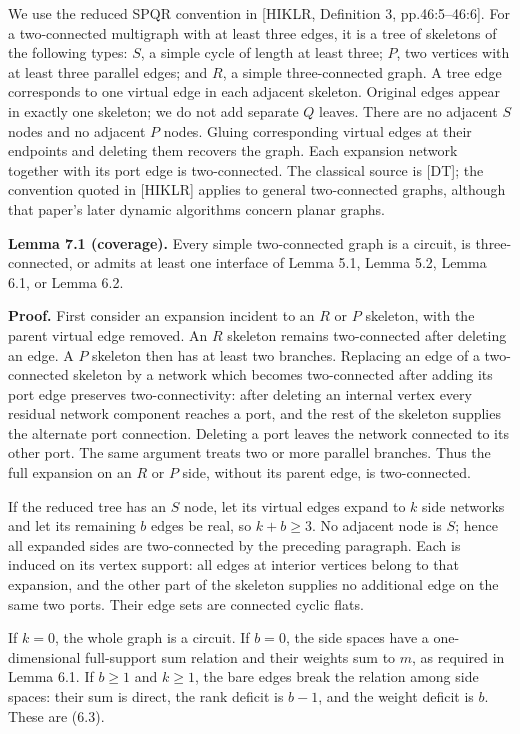 \documentclass[11pt]{article}
\begin{document}
We use the reduced SPQR convention in [HIKLR, Definition 3, pp.46:5--46:6]. For a two-connected multigraph with at least three edges, it is a tree of skeletons of the following types: $S$, a simple cycle of length at least three; $P$, two vertices with at least three parallel edges; and $R$, a simple three-connected graph. A tree edge corresponds to one virtual edge in each adjacent skeleton. Original edges appear in exactly one skeleton; we do not add separate $Q$ leaves. There are no adjacent $S$ nodes and no adjacent $P$ nodes. Gluing corresponding virtual edges at their endpoints and deleting them recovers the graph. Each expansion network together with its port edge is two-connected. The classical source is [DT]; the convention quoted in [HIKLR] applies to general two-connected graphs, although that paper's later dynamic algorithms concern planar graphs.

\textbf{Lemma 7.1 (coverage).} Every simple two-connected graph is a circuit, is three-connected, or admits at least one interface of Lemma 5.1, Lemma 5.2, Lemma 6.1, or Lemma 6.2.

\textbf{Proof.} First consider an expansion incident to an $R$ or $P$ skeleton, with the parent virtual edge removed. An $R$ skeleton remains two-connected after deleting an edge. A $P$ skeleton then has at least two branches. Replacing an edge of a two-connected skeleton by a network which becomes two-connected after adding its port edge preserves two-connectivity: after deleting an internal vertex every residual network component reaches a port, and the rest of the skeleton supplies the alternate port connection. Deleting a port leaves the network connected to its other port. The same argument treats two or more parallel branches. Thus the full expansion on an $R$ or $P$ side, without its parent edge, is two-connected.

If the reduced tree has an $S$ node, let its virtual edges expand to $k$ side networks and let its remaining $b$ edges be real, so $k+b\ge3$. No adjacent node is $S$; hence all expanded sides are two-connected by the preceding paragraph. Each is induced on its vertex support: all edges at interior vertices belong to that expansion, and the other part of the skeleton supplies no additional edge on the same two ports. Their edge sets are connected cyclic flats.

If $k=0$, the whole graph is a circuit. If $b=0$, the side spaces have a one-dimensional full-support sum relation and their weights sum to $m$, as required in Lemma 6.1. If $b\ge1$ and $k\ge1$, the bare edges break the relation among side spaces: their sum is direct, the rank deficit is $b-1$, and the weight deficit is $b$. These are (6.3).
\end{document}
